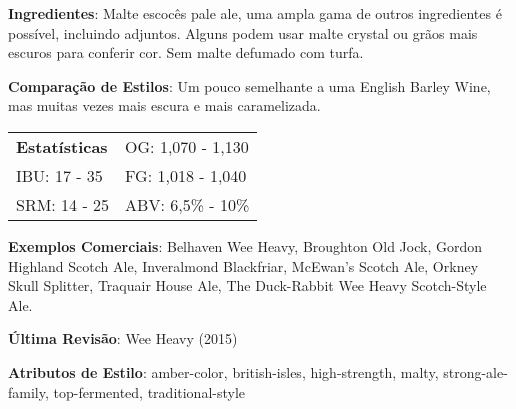 \textbf{Ingredientes}: Malte escocês pale ale, uma ampla gama de outros ingredientes é possível, incluindo adjuntos. Alguns podem usar malte crystal ou grãos mais escuros para conferir cor. Sem malte defumado com turfa.

\textbf{Comparação de Estilos}: Um pouco semelhante a uma English Barley Wine, mas muitas vezes mais escura e mais caramelizada.

\begin{tabular}{@{}p{35mm}p{35mm}@{}}
  \textbf{Estatísticas} & OG: 1,070 - 1,130 \\
  IBU: 17 - 35  & FG: 1,018 - 1,040  \\
  SRM: 14 - 25  & ABV: 6,5\% - 10\%
\end{tabular}

\textbf{Exemplos Comerciais}: Belhaven Wee Heavy, Broughton Old Jock, Gordon Highland Scotch Ale, Inveralmond Blackfriar, McEwan's Scotch Ale, Orkney Skull Splitter, Traquair House Ale, The Duck-Rabbit Wee Heavy Scotch-Style Ale.

\textbf{Última Revisão}: Wee Heavy (2015)

\textbf{Atributos de Estilo}: amber-color, british-isles, high-strength, malty, strong-ale-family, top-fermented, traditional-style
